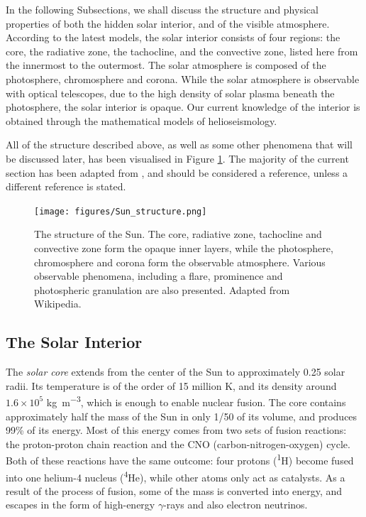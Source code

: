 In the following Subsections, we shall discuss the structure and physical properties of both the hidden solar interior, and of the visible atmosphere.
According to the latest models, the solar interior consists of four regions: the core, the radiative zone, the tachocline, and the convective zone, listed here from the innermost to the outermost.
The solar atmosphere is composed of the photosphere, chromosphere and corona.
While the solar atmosphere is observable with optical telescopes, due to the high density of solar plasma beneath the photosphere, the solar interior is opaque.
Our current knowledge of the interior is obtained through the mathematical models of helioseismology.

All of the structure described above, as well as some other phenomena that will be discussed later, has been visualised in Figure \ref{fig:sun}.
The majority of the current section has been adapted from \cite{Priest2014}, and should be considered a reference, unless a different reference is stated.

\begin{figure}[t]
\centering
\texttt{[image: figures/Sun\_structure.png]}
\caption{The structure of the Sun. The core, radiative zone, tachocline and convective zone form the opaque inner layers, while the photosphere, chromosphere and corona form the observable atmosphere. Various observable phenomena, including a flare, prominence and photospheric granulation are also presented.
Adapted from Wikipedia.}
\label{fig:sun}
\end{figure}

\subsection{The Solar Interior}
\label{subsec:interior}

The \emph{solar core} extends from the center of the Sun to approximately 0.25 solar radii.
Its temperature is of the order of 15 million \si{K}, and its density around $1.6 \times 10^5$ \si{kg.m^{-3}}, which is enough to enable nuclear fusion.
The core contains approximately half the mass of the Sun in only 1/50 of its volume, and produces 99\% of its energy.
Most of this energy comes from two sets of fusion reactions: the proton-proton chain reaction and the CNO (carbon-nitrogen-oxygen) cycle.
Both of these reactions have the same outcome: four protons (\textsuperscript{1}H) become fused into one helium-4 nucleus (\textsuperscript{4}He), while other atoms only act as catalysts.
As a result of the process of fusion, some of the mass is converted into energy, and escapes in the form of high-energy $\gamma$-rays and also electron neutrinos.

